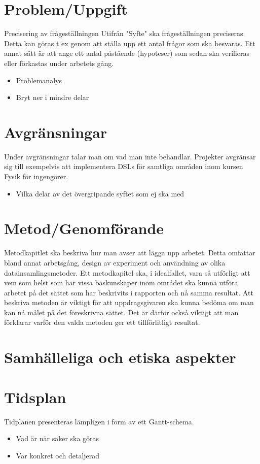 \documentclass[12pt,a4paper]{article}
\begin{document}
\section{Problem/Uppgift}

Precisering av frågeställningen Utifrån "Syfte" ska frågeställningen preciseras.
Detta kan göras t ex genom att ställa upp ett antal frågor som ska besvaras. Ett
annat sätt är att ange ett antal påstående (hypoteser) som sedan ska verifieras eller
förkastas under arbetets gång.

\begin{itemize}
    \item Problemanalys
    \item Bryt ner i mindre delar
\end{itemize}

\section{Avgränsningar}

Under avgränsningar talar man om vad man inte behandlar.
Projekter avgränsar sig till exempelvis att implementera DSLs för samtliga områden
inom kursen Fysik för ingengörer.

\begin{itemize}
    \item Vilka delar av det övergripande syftet som ej ska med
\end{itemize}

\section{Metod/Genomförande}

Metodkapitlet ska beskriva hur man avser att lägga upp arbetet. Detta
omfattar bland annat arbetsgång, design av experiment och användning av olika
datainsamlingsmetoder. Ett metodkapitel ska, i idealfallet, vara så utförligt att
vem som helst som har vissa baskunskaper inom området ska kunna utföra arbetet
på det sättet som har beskrivits i rapporten och nå samma resultat. Att beskriva
metoden är viktigt för att uppdragsgivaren ska kunna bedöma om man kan nå målet
på det föreskrivna sättet. Det är därför också viktigt att man förklarar varför den
valda metoden ger ett tillförlitligt resultat.

\section{Samhälleliga och etiska aspekter}

\section{Tidsplan}

Tidplanen presenteras lämpligen i form av ett Gantt-schema.

\begin{itemize}
    \item Vad är när saker ska göras
    \item Var konkret och detaljerad
\end{itemize}
\end{document}
